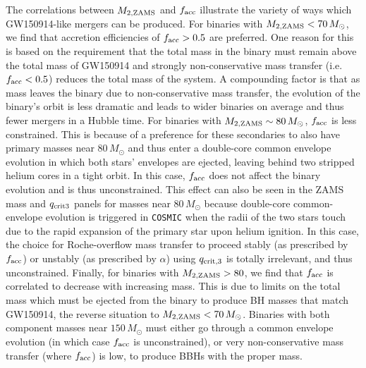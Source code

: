 \documentclass[twocolumn]{aastex631}
\begin{document}
The correlations between $M_{2,\rm{ZAMS}}$ and $f_{\rm acc}$ illustrate the
variety of ways which GW150914-like mergers can be produced. For binaries with
$M_{2,\rm{ZAMS}} < 70\,M_{\odot}$, we find that accretion efficiencies of
$f_{\rm acc} > 0.5$ are preferred. One reason for this is based on the
requirement that the total mass in the binary must remain above the total mass
of GW150914 and strongly non-conservative mass transfer (i.e. $f_{\rm acc} <
0.5$) reduces the total mass of the system. A compounding factor is that as mass
leaves the binary due to non-conservative mass transfer, the evolution of the
binary's orbit is less dramatic and leads to wider binaries on average and thus
fewer mergers in a Hubble time. For binaries with $M_{2,\rm{ZAMS}} \sim
80\,M_{\odot}$, $f_{\rm acc}$ is less constrained. This is because of a
preference for these secondaries to also have primary masses near $
80\,M_{\odot}$ and thus enter a double-core common envelope evolution in which
both stars' envelopes are ejected, leaving behind two stripped helium cores in a
tight orbit. In this case, $f_{\rm acc}$ does not affect the binary evolution
and is thus unconstrained. This effect can also be seen in the ZAMS mass and
$q_{\rm crit 3}$ panels for masses near $80\,M_{\odot}$ because double-core
common-envelope evolution is triggered in \texttt{COSMIC} when the radii of the
two stars touch due to the rapid expansion of the primary star upon helium
ignition. In this case, the choice for Roche-overflow mass transfer to proceed
stably (as prescribed by $f_{\rm{acc}}$) or unstably (as prescribed by $\alpha$)
using $q_{\rm crit, 3}$ is totally irrelevant, and thus unconstrained. Finally,
for binaries with $M_{2,\rm{ZAMS}} > 80$, we find that $f_{\rm acc}$ is
correlated to decrease with increasing mass. This is due to limits on the total
mass which must be ejected from the binary to produce BH masses that match
GW150914, the reverse situation to $M_{2,\rm{ZAMS}} < 70 \, M_\odot$. Binaries
with both component masses near $150\,M_{\odot}$ must either go through a common
envelope evolution (in which case $f_{\rm acc}$ is unconstrained), or very
non-conservative mass transfer (where $f_{\rm acc}$) is low, to produce BBHs
with the proper mass.
\end{document}
